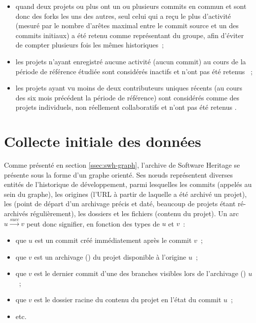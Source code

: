 \begin{itemize}
    \item quand deux projets ou plus ont un ou plusieurs \glspl{commit} en commun et sont donc des
        \glspl{fork} les uns des autres, seul celui qui a reçu le plus d'activité (mesuré par le nombre
        d'arêtes maximal entre le \gls{commit} source et un des \glspl{commit} initiaux) a été retenu comme
        représentant du groupe, afin d'éviter de compter plusieurs fois les mêmes historiques ;
    \item les projets n'ayant enregistré aucune activité (aucun \gls{commit}) au cours de la période de
        référence étudiée sont considérés inactifs et n'ont pas été retenus
        \parencite[voir][]{mining-github-2014} ;
    \item les projets ayant vu moins de deux contributeurs uniques récents (au cours des six mois précédent la
        période de référence) sont considérés comme des projets individuels, non réellement collaboratifs et
        n'ont pas été retenus \parencite[voir][]{mining-github-2014}.
\end{itemize}

\section{Collecte initiale des données}

Comme présenté en section \ref{ssec:swh-graph}, l'archive de Software Heritage se présente sous la forme d'un
graphe orienté. Ses nœuds représentent diverses entités de l'historique de développement, parmi lesquelles les
\glspl{commit} (appelés  au sein du graphe), les origines (l'URL à partir de laquelle a été
archivé un projet), les  (point de départ d'un archivage précis et daté, beaucoup de projets
étant ré-archivés régulièrement), les dossiers et les fichiers (contenu du projet). Un arc $u
\xrightarrow{succ} v$ peut donc signifier, en fonction des types de $u$ et $v$ : 

\begin{itemize}
    \item que $u$ est un \gls{commit} créé immédiatement après le \gls{commit} $v$ ;
    \item que $v$ est un archivage () du projet disponible à l'origine $u$ ;
    \item que $v$ est le dernier \gls{commit} d'une des branches visibles lors de l'archivage ()
        $u$ ;
    \item que $v$ est le dossier racine du contenu du projet en l'état du \gls{commit} $u$ ;
    \item etc.
\end{itemize}


